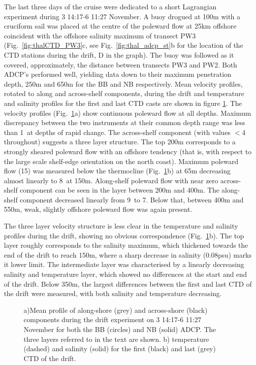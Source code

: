 The last three days of the cruise were dedicated to a short
Lagrangian experiment during 3 14:17-6 11:27 November. A buoy
drogued at 100m with a cruciform sail was placed at the centre of
the poleward flow at 25km offshore coincident with the offshore
salinity maximum of transect PW3 (Fig.~\ref{fig:thalCTD_PW3}c, see
Fig.~\ref{fig:thal_adcp_st}b for the location of the CTD stations
during the drift, D in the graph). The buoy was followed as it
covered, approximately, the distance between transects PW3 and
PW2. Both ADCP's performed well, yielding data down to their
maximum penetration depth, 250m and 650m for the BB and NB
respectively. Mean velocity profiles, rotated to along and
across-shelf components, during the drift and temperature and
salinity profiles for the first and last CTD casts are shown in
figure \ref{fig:thalADCP_PW32}. The velocity profiles
(Fig.~\ref{fig:thalADCP_PW32}a) show continuous poleward flow at
all depths. Maximum discrepancy between the two instruments at
their common depth range was less than 1\velc\, at depths of rapid
change. The across-shelf component (with values $<$4\velc\,
throughout) suggests a three layer structure. The top 200m
corresponds to a strongly sheared poleward flow with an offshore
tendency (that is, with respect to the large scale shelf-edge
orientation on the north coast). Maximum poleward flow (15\velc)
was measured below the thermocline (Fig.~\ref{fig:thalADCP_PW32}b)
at 65m decreasing almost linearly to 8\velc\, at 150m. Along-shelf
poleward flow with near zero across-shelf component can be seen in
the layer between 200m and 400m. The along-shelf component
decreased linearly from 9\velc\, to 7\velc. Below that, between
400m and 550m, weak, slightly offshore poleward flow was again
present.

The three layer velocity structure is less clear in the
temperature and salinity profiles during the drift, showing no
obvious correspondence (Fig.~\ref{fig:thalADCP_PW32}b). The top
layer roughly corresponds to the salinity maximum, which thickened
towards the end of the drift to reach 150m, where a sharp decrease
in salinity (0.08psu) marks it lower limit. The intermediate layer
was characterised by a linearly decreasing salinity and
temperature layer, which showed no differences at the start and
end of the drift. Below 350m, the largest differences between the
first and last CTD of the drift were measured, with both salinity
and temperature decreasing.
\begin{figure}[t]
\arribacap \centering %
%
\subfigure[]{\texttt{[image: B1-B9]}}\quad%
\caption{a)Mean profile of along-shore (grey) and across-shore
(black) components during the drift experiment on 3 14:17-6 11:27
November for both the BB (circles) and NB (solid) ADCP. The three
layers referred to in the text are shown. b) temperature (dashed)
and salinity (solid) for the first (black) and last (grey) CTD of
the drift.} \label{fig:thalADCP_PW32}
\end{figure}

